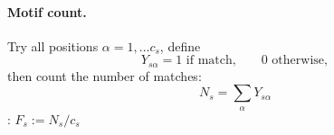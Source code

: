 {  \bigskip \bigskip \pause
  \paragraph{Motif count.} Try all positions $\alpha = 1, \dots c_s$, define 
  $$
  Y_{s\alpha} = 1 \text{ if match,} \qquad 0 \text{ otherwise},
  $$
  then count the number of matches:
  $$
  N_s = \sum_\alpha Y_{s\alpha}
  $$
  \ra {}: $F_s := N_s / c_s$
  
}

% 
% 

